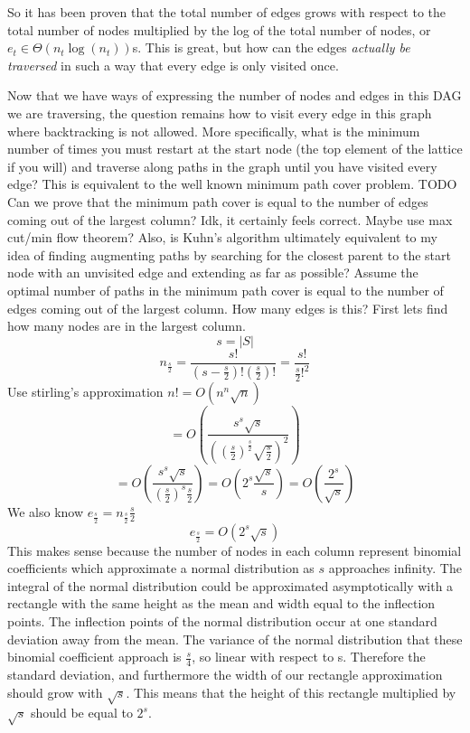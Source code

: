 \documentclass{article}
\begin{document}
So it has been proven that the total number of edges grows with respect to the total number of nodes multiplied by the log of the total number of nodes, or $e_t\in \Theta(n_t\log(n_t))$s. This is great, but how can the edges \textit{actually be traversed} in such a way that every edge is only visited once.

Now that we have ways of expressing the number of nodes and edges in this DAG we are traversing, the question remains how to visit every edge in this graph
where backtracking is not allowed. More specifically, what is the minimum
number of times you must restart at the start node (the top element of the
lattice if you will) and traverse along paths in the graph until you have
visited every edge? This is equivalent to the well known minimum path cover
problem.  TODO Can we prove that the minimum path cover is equal to the number
of edges coming out of the largest column? Idk, it certainly feels correct.
Maybe use max cut/min flow theorem? Also, is Kuhn's algorithm ultimately
equivalent to my idea of finding augmenting paths by searching for the closest
parent to the start node with an unvisited edge and extending as far as
possible?  Assume the optimal number of paths in the minimum path cover is
equal to the number of edges coming out of the largest column. How many edges
is this? First lets find how many nodes are in the largest column.
$$s = |S|$$
$$n_{\frac{s}{2}} = \frac{s!}{(s - \frac{s}{2})!(\frac{s}{2})!} = \frac{s!}{\frac{s}{2}!^2}$$
Use stirling's approximation $n! = O(n^n\sqrt{n})$
$$ = O(\frac{s^s\sqrt{s}}{((\frac{s}{2})^\frac{s}{2}\sqrt{\frac{s}{2}})^2})$$
$$ = O(\frac{s^s\sqrt{s}}{(\frac{s}{2})^s\frac{s}{2}}) = O(2^s\frac{\sqrt{s}}{s}) = O(\frac{2^s}{\sqrt{s}})$$
We also know $e_{\frac{s}{2}} = n_{\frac{s}{2}}\frac{s}{2}$
$$e_{\frac{s}{2}} = O(2^s\sqrt{s})$$
This makes sense because the number of nodes in each column represent binomial coefficients which approximate a normal distribution as $s$ approaches infinity. The integral of the normal distribution could be approximated asymptotically with a rectangle with the same height as the mean and width equal to the inflection points. The inflection points of the normal distribution occur at one standard deviation away from the mean. The variance of the normal distribution that these binomial coefficient approach is $\frac{s}{4}$, so linear with respect to s. Therefore the standard deviation, and furthermore the width of our rectangle approximation should grow with $\sqrt{s}$. This means that the height of this rectangle multiplied by $\sqrt{s}$ should be equal to $2^s$.
\end{document}
